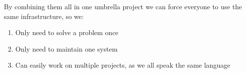 \documentclass[12pt,]{article}
\providecommand{\tightlist}{%
  \setlength{\itemsep}{0pt}\setlength{\parskip}{0pt}}
\begin{document}
By combining them all in one umbrella project we can force everyone to
use the same infrastructure, so we:

\begin{enumerate}
\def\labelenumi{\arabic{enumi}.}
\tightlist
\item
  Only need to solve a problem once
\item
  Only need to maintain one system
\item
  Can easily work on multiple projects, as we all speak the same
  language
\end{enumerate}


\end{document}
